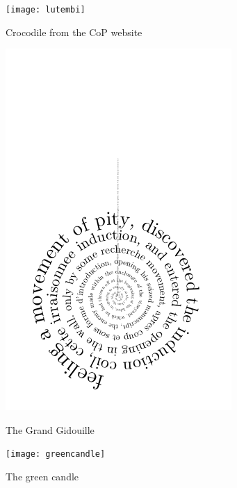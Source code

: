 \begin{figure}[!htbp]
  \centering
  \begin{minipage}{.275\linewidth}
    \texttt{[image: lutembi]}
  \caption[Crocodile]{Crocodile from the CoP website}
  \label{img1}
  \end{minipage}
  \hspace{.05\linewidth}
  \begin{minipage}{.275\linewidth}
    \includegraphics[width=\linewidth]{spiral}
  \caption[Gidouille]{The Grand Gidouille}
  \label{img2}
  \end{minipage}
  \hspace{.05\linewidth}
  \begin{minipage}{.275\linewidth}
    \texttt{[image: greencandle]}
  \caption[Green Candle]{The green candle}
  \label{img3}
  \end{minipage}
\end{figure}

